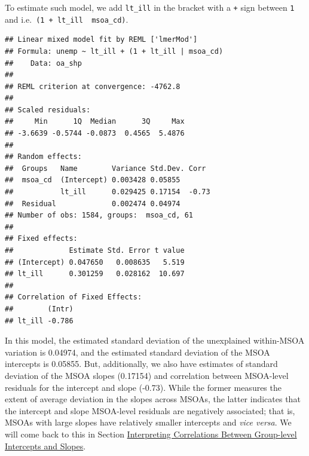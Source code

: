\documentclass[
]{book}
\newenvironment{Shaded}{\begin{snugshade}}{\end{snugshade}}
\newcommand{\CommentTok}[1]{\textcolor[rgb]{0.56,0.35,0.01}{\textit{#1}}}
\newcommand{\DataTypeTok}[1]{\textcolor[rgb]{0.13,0.29,0.53}{#1}}
\newcommand{\DecValTok}[1]{\textcolor[rgb]{0.00,0.00,0.81}{#1}}
\newcommand{\KeywordTok}[1]{\textcolor[rgb]{0.13,0.29,0.53}{\textbf{#1}}}
\newcommand{\NormalTok}[1]{#1}
\newcommand{\OperatorTok}[1]{\textcolor[rgb]{0.81,0.36,0.00}{\textbf{#1}}}
\newcommand{\StringTok}[1]{\textcolor[rgb]{0.31,0.60,0.02}{#1}}
\begin{document}
To estimate such model, we add \texttt{lt\_ill} in the bracket with a \texttt{+} sign between \texttt{1} and \texttt{\textbar{}} i.e.~\texttt{(1\ +\ lt\_ill\ \textbar{}\ msoa\_cd)}.

\begin{Shaded}
\end{Shaded}

\begin{verbatim}
## Linear mixed model fit by REML ['lmerMod']
## Formula: unemp ~ lt_ill + (1 + lt_ill | msoa_cd)
##    Data: oa_shp
## 
## REML criterion at convergence: -4762.8
## 
## Scaled residuals: 
##     Min      1Q  Median      3Q     Max 
## -3.6639 -0.5744 -0.0873  0.4565  5.4876 
## 
## Random effects:
##  Groups   Name        Variance Std.Dev. Corr 
##  msoa_cd  (Intercept) 0.003428 0.05855       
##           lt_ill      0.029425 0.17154  -0.73
##  Residual             0.002474 0.04974       
## Number of obs: 1584, groups:  msoa_cd, 61
## 
## Fixed effects:
##             Estimate Std. Error t value
## (Intercept) 0.047650   0.008635   5.519
## lt_ill      0.301259   0.028162  10.697
## 
## Correlation of Fixed Effects:
##        (Intr)
## lt_ill -0.786
\end{verbatim}

In this model, the estimated standard deviation of the unexplained within-MSOA variation is 0.04974, and the estimated standard deviation of the MSOA intercepts is 0.05855. But, additionally, we also have estimates of standard deviation of the MSOA slopes (0.17154) and correlation between MSOA-level residuals for the intercept and slope (-0.73). While the former measures the extent of average deviation in the slopes across MSOAs, the latter indicates that the intercept and slope MSOA-level residuals are negatively associated; that is, MSOAs with large slopes have relatively smaller intercepts and \emph{vice versa}. We will come back to this in Section \protect\hyperlink{interpreting-correlations-between-group-level-intercepts-and-slopes}{Interpreting Correlations Between Group-level Intercepts and Slopes}.
\end{document}
